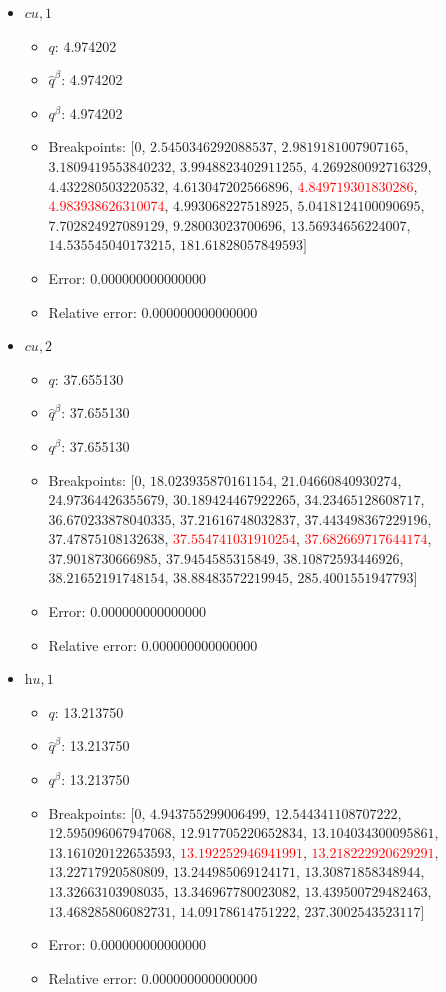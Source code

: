 \documentclass{article}%
\begin{document}
\begin{itemize}
\begin{itemize}
		\item Error: 0.000000000000000%
		\item Relative error: 0.000000000000000%
	\end{itemize}%
	\item $\textit{cu},1$%
	\begin{itemize}%
		\item $q$: 4.974202%
		\item $\hat{q}^\beta$: 4.974202%
		\item $q^\beta$: 4.974202%
		\item Breakpoints: $[$$0$, $2.5450346292088537$, $2.9819181007907165$, $3.1809419553840232$, $3.9948823402911255$, $4.269280092716329$, $4.432280503220532$, $4.613047202566896$, \textcolor{red}{$4.849719301830286$}, \textcolor{red}{$4.983938626310074$}, $4.993068227518925$, $5.0418124100090695$, $7.702824927089129$, $9.28003023700696$, $13.56934656224007$, $14.535545040173215$, $181.61828057849593$$]$%
		\item Error: 0.000000000000000%
		\item Relative error: 0.000000000000000%
	\end{itemize}%
	\item $\textit{cu},2$%
	\begin{itemize}%
		\item $q$: 37.655130%
		\item $\hat{q}^\beta$: 37.655130%
		\item $q^\beta$: 37.655130%
		\item Breakpoints: $[$$0$, $18.023935870161154$, $21.04660840930274$, $24.97364426355679$, $30.189424467922265$, $34.23465128608717$, $36.670233878040335$, $37.21616748032837$, $37.443498367229196$, $37.47875108132638$, \textcolor{red}{$37.554741031910254$}, \textcolor{red}{$37.682669717644174$}, $37.9018730666985$, $37.9454585315849$, $38.10872593446926$, $38.21652191748154$, $38.88483572219945$, $285.4001551947793$$]$%
		\item Error: 0.000000000000000%
		\item Relative error: 0.000000000000000%
	\end{itemize}%
	\item $\textit{hu},1$%
	\begin{itemize}%
		\item $q$: 13.213750%
		\item $\hat{q}^\beta$: 13.213750%
		\item $q^\beta$: 13.213750%
		\item Breakpoints: $[$$0$, $4.943755299006499$, $12.544341108707222$, $12.595096067947068$, $12.917705220652834$, $13.104034300095861$, $13.161020122653593$, \textcolor{red}{$13.192252946941991$}, \textcolor{red}{$13.218222920629291$}, $13.22717920580809$, $13.244985069124171$, $13.30871858348944$, $13.32663103908035$, $13.346967780023082$, $13.439500729482463$, $13.468285806082731$, $14.09178614751222$, $237.3002543523117$$]$%
		\item Error: 0.000000000000000%
		\item Relative error: 0.000000000000000%
	\end{itemize}%
\end{itemize}%
\end{document}

